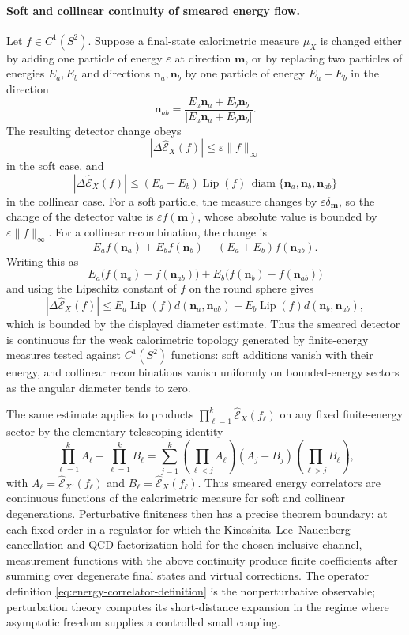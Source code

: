\paragraph{Soft and collinear continuity of smeared energy flow.}
Let \(f\in C^1(S^2)\).  Suppose a final-state calorimetric measure
\(\mu_X\) is changed either by adding one particle of energy \(\varepsilon\) at
direction \(\mathbf m\), or by replacing two particles of energies \(E_a,E_b\)
and directions \(\mathbf n_a,\mathbf n_b\) by one particle of energy
\(E_a+E_b\) in the direction
\[
  \mathbf n_{ab}
  =
  \frac{E_a\mathbf n_a+E_b\mathbf n_b}
       {|E_a\mathbf n_a+E_b\mathbf n_b|}.
\]
The resulting detector change obeys
\[
  \left|\Delta\widehat{\mathcal E}_X(f)\right|
  \leq
  \varepsilon \|f\|_\infty
\]
in the soft case, and
\[
  \left|\Delta\widehat{\mathcal E}_X(f)\right|
  \leq
  (E_a+E_b)\operatorname{Lip}(f)\,
  \operatorname{diam}\{\mathbf n_a,\mathbf n_b,\mathbf n_{ab}\}
\]
in the collinear case.
For a soft particle, the measure changes by
\(\varepsilon\delta_{\mathbf m}\), so the change of the detector value is
\(\varepsilon f(\mathbf m)\), whose absolute value is bounded by
\(\varepsilon\|f\|_\infty\).  For a collinear recombination, the change is
\[
  E_a f(\mathbf n_a)+E_b f(\mathbf n_b)
  -(E_a+E_b)f(\mathbf n_{ab}).
\]
Writing this as
\[
  E_a\bigl(f(\mathbf n_a)-f(\mathbf n_{ab})\bigr)
  +
  E_b\bigl(f(\mathbf n_b)-f(\mathbf n_{ab})\bigr)
\]
and using the Lipschitz constant of \(f\) on the round sphere gives
\[
  |\Delta\widehat{\mathcal E}_X(f)|
  \leq
  E_a\operatorname{Lip}(f)d(\mathbf n_a,\mathbf n_{ab})
  +
  E_b\operatorname{Lip}(f)d(\mathbf n_b,\mathbf n_{ab}),
\]
which is bounded by the displayed diameter estimate.  Thus the smeared
detector is continuous for the weak calorimetric topology generated by
finite-energy measures tested against \(C^1(S^2)\) functions: soft additions
vanish with their energy, and collinear recombinations vanish uniformly on
bounded-energy sectors as the angular diameter tends to zero.

The same estimate applies to products
\(\prod_{\ell=1}^k\widehat{\mathcal E}_X(f_\ell)\) on any fixed
finite-energy sector by the elementary telescoping identity
\[
  \prod_{\ell=1}^k A_\ell-\prod_{\ell=1}^k B_\ell
  =
  \sum_{j=1}^k
  \left(\prod_{\ell<j}A_\ell\right)
  (A_j-B_j)
  \left(\prod_{\ell>j}B_\ell\right),
\]
with \(A_\ell=\widehat{\mathcal E}_{X'}(f_\ell)\) and
\(B_\ell=\widehat{\mathcal E}_X(f_\ell)\).  Thus smeared energy correlators
are continuous functions of the calorimetric measure for soft and collinear
degenerations.  Perturbative finiteness then has a precise theorem boundary:
at each fixed order in a regulator for which the Kinoshita--Lee--Nauenberg
cancellation and QCD factorization hold for the chosen inclusive channel,
measurement functions with the above continuity produce finite coefficients
after summing over degenerate final states and virtual corrections.  The
operator definition \eqref{eq:energy-correlator-definition} is the
nonperturbative observable; perturbation theory computes its short-distance
expansion in the regime where asymptotic freedom supplies a controlled small
coupling.

